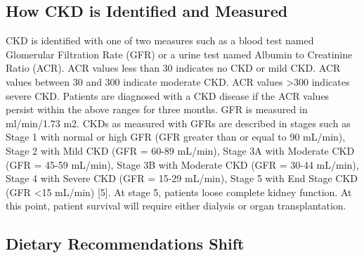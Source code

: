 \subsection{How CKD is Identified and Measured}
CKD is identified with one of two measures such as a blood test named Glomerular Filtration Rate (GFR) or a urine test named Albumin to Creatinine Ratio (ACR).  ACR values less than 30 indicates no CKD or mild CKD. ACR values between 30 and 300 indicate moderate CKD. ACR values \textgreater 300 indicates severe CKD. Patients are diagnosed with a CKD disease if the ACR values persist within the above ranges for three months. GFR is measured in ml/min/1.73 m2. CKDs as measured with GFRs are described in stages such as Stage 1 with normal or high GFR (GFR greater than or equal to  90 mL/min), Stage 2 with Mild CKD (GFR = 60-89 mL/min), Stage 3A with Moderate CKD (GFR = 45-59 mL/min), Stage 3B with Moderate CKD (GFR = 30-44 mL/min), Stage 4 with Severe CKD (GFR = 15-29 mL/min), Stage 5 with End Stage CKD (GFR \textless 15 mL/min) [5]. At stage 5, patients loose complete kidney function. At this point, patient survival will require either dialysis or organ transplantation.

\subsection{Dietary Recommendations Shift}

